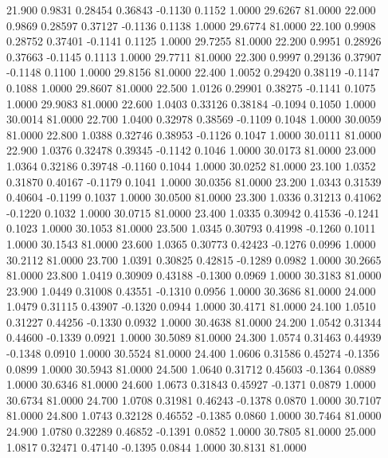   21.900   0.9831   0.28454   0.36843  -0.1130   0.1152   1.0000  29.6267  81.0000
  22.000   0.9869   0.28597   0.37127  -0.1136   0.1138   1.0000  29.6774  81.0000
  22.100   0.9908   0.28752   0.37401  -0.1141   0.1125   1.0000  29.7255  81.0000
  22.200   0.9951   0.28926   0.37663  -0.1145   0.1113   1.0000  29.7711  81.0000
  22.300   0.9997   0.29136   0.37907  -0.1148   0.1100   1.0000  29.8156  81.0000
  22.400   1.0052   0.29420   0.38119  -0.1147   0.1088   1.0000  29.8607  81.0000
  22.500   1.0126   0.29901   0.38275  -0.1141   0.1075   1.0000  29.9083  81.0000
  22.600   1.0403   0.33126   0.38184  -0.1094   0.1050   1.0000  30.0014  81.0000
  22.700   1.0400   0.32978   0.38569  -0.1109   0.1048   1.0000  30.0059  81.0000
  22.800   1.0388   0.32746   0.38953  -0.1126   0.1047   1.0000  30.0111  81.0000
  22.900   1.0376   0.32478   0.39345  -0.1142   0.1046   1.0000  30.0173  81.0000
  23.000   1.0364   0.32186   0.39748  -0.1160   0.1044   1.0000  30.0252  81.0000
  23.100   1.0352   0.31870   0.40167  -0.1179   0.1041   1.0000  30.0356  81.0000
  23.200   1.0343   0.31539   0.40604  -0.1199   0.1037   1.0000  30.0500  81.0000
  23.300   1.0336   0.31213   0.41062  -0.1220   0.1032   1.0000  30.0715  81.0000
  23.400   1.0335   0.30942   0.41536  -0.1241   0.1023   1.0000  30.1053  81.0000
  23.500   1.0345   0.30793   0.41998  -0.1260   0.1011   1.0000  30.1543  81.0000
  23.600   1.0365   0.30773   0.42423  -0.1276   0.0996   1.0000  30.2112  81.0000
  23.700   1.0391   0.30825   0.42815  -0.1289   0.0982   1.0000  30.2665  81.0000
  23.800   1.0419   0.30909   0.43188  -0.1300   0.0969   1.0000  30.3183  81.0000
  23.900   1.0449   0.31008   0.43551  -0.1310   0.0956   1.0000  30.3686  81.0000
  24.000   1.0479   0.31115   0.43907  -0.1320   0.0944   1.0000  30.4171  81.0000
  24.100   1.0510   0.31227   0.44256  -0.1330   0.0932   1.0000  30.4638  81.0000
  24.200   1.0542   0.31344   0.44600  -0.1339   0.0921   1.0000  30.5089  81.0000
  24.300   1.0574   0.31463   0.44939  -0.1348   0.0910   1.0000  30.5524  81.0000
  24.400   1.0606   0.31586   0.45274  -0.1356   0.0899   1.0000  30.5943  81.0000
  24.500   1.0640   0.31712   0.45603  -0.1364   0.0889   1.0000  30.6346  81.0000
  24.600   1.0673   0.31843   0.45927  -0.1371   0.0879   1.0000  30.6734  81.0000
  24.700   1.0708   0.31981   0.46243  -0.1378   0.0870   1.0000  30.7107  81.0000
  24.800   1.0743   0.32128   0.46552  -0.1385   0.0860   1.0000  30.7464  81.0000
  24.900   1.0780   0.32289   0.46852  -0.1391   0.0852   1.0000  30.7805  81.0000
  25.000   1.0817   0.32471   0.47140  -0.1395   0.0844   1.0000  30.8131  81.0000
